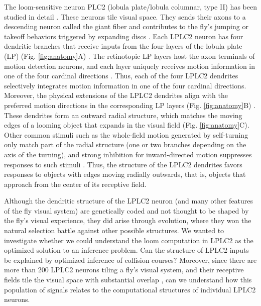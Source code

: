 \documentclass[9pt,lineno]{elife}
\begin{document}
The loom-sensitive neuron  PLC2 (lobula plate/lobula columnar, type II) \citep{wu2016visual} has been studied in detail \citep{klapoetke2017ultra}. These neurons tile visual space. They sends their axons to a descending neuron called the giant fiber and contributes to the fly's jumping or takeoff behaviors triggered by expanding discs \citep{card2008visually,ache2019neural}. Each LPLC2 neuron has four dendritic branches that receive inputs from the four layers of the lobula plate (LP) (Fig. \ref{fig:anatomy}A) \citep{maisak2013directional,klapoetke2017ultra}. The retinotopic LP layers host the axon terminals of motion detection neurons, and each layer uniquely receives motion information in one of the four cardinal directions \citep{maisak2013directional}. Thus, each of the four LPLC2 dendrites selectively integrates motion information in one of the four cardinal directions. Moreover, the physical extensions of the LPLC2 dendrites align with the preferred motion directions in the corresponding LP layers (Fig. \ref{fig:anatomy}B) \citep{klapoetke2017ultra}. These dendrites form an outward radial structure, which matches the moving edges of a looming object that expands in the visual field (Fig. \ref{fig:anatomy}C). Other common stimuli such as the whole-field motion generated by self-turning only match part of the radial structure (one or two branches depending on the axis of the turning), and strong inhibition for inward-directed motion suppresses responses to such stimuli \citep{klapoetke2017ultra}. Thus, the structure of the LPLC2 dendrites favors responses to objects with edges moving radially outwards, that is, objects that approach from the center of its receptive field.

Although the dendritic structure of the LPLC2 neuron (and many other features of the fly visual system) are genetically coded and not thought to be shaped by the fly's visual experience, they did arise through evolution, where they won the natural selection battle against other possible structures. We wanted to investigate whether we could understand the loom computation in LPLC2 as the optimized solution to an inference problem. Can the structure of LPLC2 inputs be explained by optimized inference of collision courses? Moreover, since there are more than 200 LPLC2 neurons tiling a fly's visual system, and their receptive fields tile the visual space with substantial overlap \citep{klapoetke2017ultra,ache2019neural}, can we understand how this population of signals relates to the computational structures of individual LPLC2 neurons.
\end{document}
